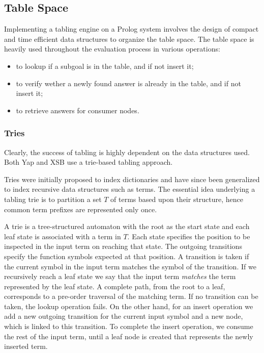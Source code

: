\subsection{Table Space} \label{sec:table_space}
  
  Implementing a tabling engine on a Prolog system involves the design of compact and time efficient data structures
  to organize the table space. The table space is heavily used throughout the evaluation process in various operations:
  
  \begin{itemize}
    \item to lookup if a subgoal is in the table, and if not insert it;
    \item to verify wether a newly found answer is already in the table, and if not insert it;
    \item to retrieve answers for consumer nodes.
  \end{itemize}
  
  \subsubsection{Tries}
  
  Clearly, the success of tabling is highly dependent on the data structures used.
  Both Yap \cite{Rocha-00a} and XSB \cite{RamakrishnanIV-95} use a trie-based tabling approach.
  
  Tries were initially proposed to index dictionaries \cite{Fredkin-62} and have since been generalized to index recursive data structures
  such as terms. The essential idea underlying a tabling trie is to partition a set $T$ of terms based upon their structure,
  hence common term prefixes are represented only once.
  
  A trie is a tree-structured automaton with the root as the start state and each leaf state is associated with a term in $T$.
  Each state specifies the position to be inspected in the input term on reaching that state.
  The outgoing transitions specify the function symbols expected at that position.
  A transition is taken if the current symbol in the input term matches the symbol of the transition.
  If we recursively reach a leaf state we say that the input term \textit{matches} the term represented by the leaf state.
  A complete path, from the root to a leaf, corresponds to a pre-order traversal of the matching term.
  If no transition can be taken, the lookup operation fails. On the other hand, for an insert operation
  we add a new outgoing transition for the current input symbol and a new node, which is linked to this transition.
  To complete the insert operation, we consume the rest of the input term, until a leaf node is created that represents
  the newly inserted term.
  
